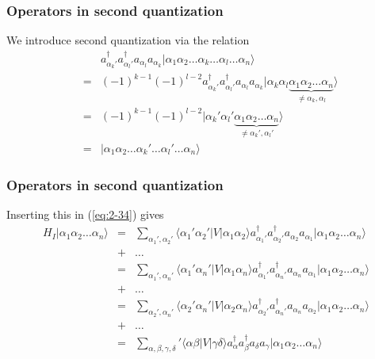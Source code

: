 \documentclass[compress]{beamer}
\newcommand*{\ket}[1]{|#1\rangle}
\newcommand*{\bra}[1]{\langle#1|}
\newcommand{\element}[3]
        {\bra{#1}#2\ket{#3}}
\begin{document}
\frame
{
  \frametitle{Operators in second quantization}
\begin{small}
{\scriptsize
We introduce second quantization via the relation
\begin{eqnarray}
	&& a_{\alpha_k'}^\dagger a_{\alpha_l'}^\dagger a_{\alpha_l} a_{\alpha_k} 
		\ket{\alpha_1\alpha_2\hdots\alpha_k\hdots\alpha_l\hdots\alpha_n} \nonumber \\
	&=& (-1)^{k-1} (-1)^{l-2} a_{\alpha_k'}^\dagger a_{\alpha_l'}^\dagger a_{\alpha_l} a_{\alpha_k}
		\ket{\alpha_k\alpha_l \underbrace{\alpha_1\alpha_2\hdots\alpha_n}_{\neq \alpha_k,\alpha_l}} \nonumber \\
	&=& (-1)^{k-1} (-1)^{l-2} 
	\ket{\alpha_k'\alpha_l' \underbrace{\alpha_1\alpha_2\hdots\alpha_n}_{\neq \alpha_k',\alpha_l'}} \nonumber \\
	&=& \ket{\alpha_1\alpha_2\hdots\alpha_k'\hdots\alpha_l'\hdots\alpha_n} \label{eq:2-35}
\end{eqnarray}
}
\end{small}
}


\frame
{
  \frametitle{Operators in second quantization}
\begin{small}
{\scriptsize
Inserting this in (\ref{eq:2-34}) gives
\begin{eqnarray}
	H_I \ket{\alpha_1\alpha_2\hdots\alpha_n}
	&=& \sum_{\alpha_1', \alpha_2'} \element{\alpha_1'\alpha_2'}{V}{\alpha_1\alpha_2}
		a_{\alpha_1'}^\dagger a_{\alpha_2'}^\dagger a_{\alpha_2} a_{\alpha_1}
		\ket{\alpha_1\alpha_2\hdots\alpha_n} \nonumber \\
	&+& \hdots \nonumber \\
	&=& \sum_{\alpha_1', \alpha_n'} \element{\alpha_1'\alpha_n'}{V}{\alpha_1\alpha_n}
		a_{\alpha_1'}^\dagger a_{\alpha_n'}^\dagger a_{\alpha_n} a_{\alpha_1}
		\ket{\alpha_1\alpha_2\hdots\alpha_n} \nonumber \\
	&+& \hdots \nonumber \\
	&=& \sum_{\alpha_2', \alpha_n'} \element{\alpha_2'\alpha_n'}{V}{\alpha_2\alpha_n}
		a_{\alpha_2'}^\dagger a_{\alpha_n'}^\dagger a_{\alpha_n} a_{\alpha_2}
		\ket{\alpha_1\alpha_2\hdots\alpha_n} \nonumber \\
	&+& \hdots \nonumber \\
	&=& \sum_{\alpha, \beta, \gamma, \delta} ' \element{\alpha\beta}{V}{\gamma\delta}
		a^\dagger_\alpha a^\dagger_\beta a_\delta a_\gamma
		\ket{\alpha_1\alpha_2\hdots\alpha_n} \label{eq:2-36}
\end{eqnarray}
}
\end{small}
}
\end{document}
